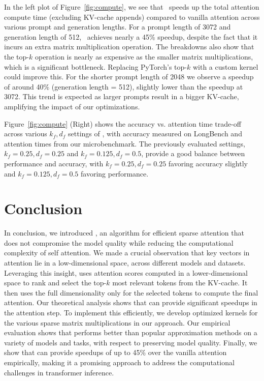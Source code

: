 In the left plot of Figure~\ref{fig:compute}, we see that \method~speeds up the
total attention compute time (excluding KV-cache appends) compared to vanilla
attention across various prompt and generation lengths. For a prompt length of
3072 and generation length of 512, \method~achieves nearly a 45\% speedup,
despite the fact that it incurs an extra matrix multiplication operation.  The
breakdowns also show that the top-$k$ operation is nearly as expensive as the
smaller matrix multiplications, which is a significant bottleneck. Replacing
PyTorch’s top-$k$ with a custom kernel could improve this. For the shorter
prompt length of 2048 we observe a speedup of around 40\% (generation length =
512), slightly lower than the speedup at 3072. This trend is expected as larger
prompts result in a bigger KV-cache, amplifying the impact of our
optimizations.

Figure~\ref{fig:compute} (Right) shows the accuracy vs. attention time
trade-off across various $k_f, d_f$ settings of \method, with accuracy measured
on LongBench and attention times from our microbenchmark. The previously
evaluated settings, $k_f = 0.25, d_f = 0.25$ and $k_f = 0.125, d_f = 0.5$,
provide a good balance between performance and accuracy, with $k_f = 0.25, d_f
= 0.25$ favoring accuracy slightly and $k_f = 0.125, d_f = 0.5$ favoring
performance.

\section{Conclusion}
\label{sec:conclusion}
In conclusion, we introduced \method, an algorithm for efficient sparse
attention that does not compromise the model quality while reducing the
computational complexity of self attention. We made a crucial observation that
key vectors in attention lie in a low-dimensional space, across different
models and datasets.
Leveraging this insight, \method uses attention scores computed in a
lower-dimensional space to rank and select the top-$k$ most relevant tokens
from the KV-cache. It then uses the full dimensionality only for the selected
tokens to compute the final attention. Our theoretical analysis shows that
\method can provide significant speedups in the attention step. To implement
this efficiently, we develop optimized kernels for the various sparse matrix
multiplications in our approach. Our empirical evaluation shows that \method
performs better than popular approximation methods on a variety of models and
tasks, with respect to preserving model quality. Finally, we show that \method
can provide speedups of up to 45\% over the vanilla attention empirically,
making it a promising approach to address the computational challenges in
transformer inference.


